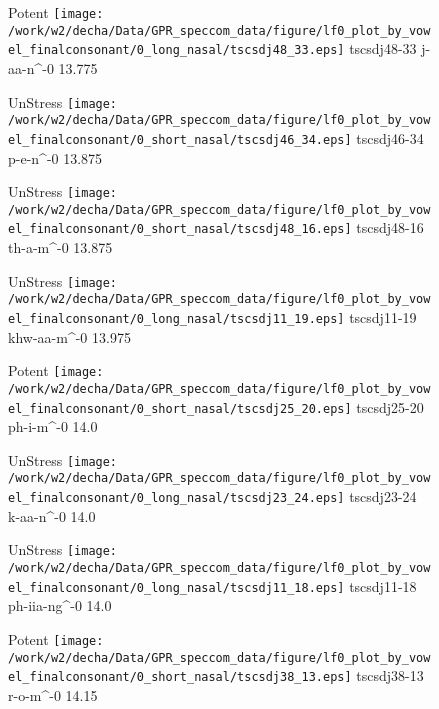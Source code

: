 \documentclass{article}
\begin{document}
\begin{figure}[t]
\begin{minipage}[b]{.24\textwidth}
\colorbox{Apricot}{Potent}
\centering
\texttt{[image: /work/w2/decha/Data/GPR\_speccom\_data/figure/lf0\_plot\_by\_vowel\_finalconsonant/0\_long\_nasal/tscsdj48\_33.eps]}
tscsdj48-33 j-aa-n\textasciicircum-0 13.775
\end{minipage}
\begin{minipage}[b]{.24\textwidth}
UnStress
\centering
\texttt{[image: /work/w2/decha/Data/GPR\_speccom\_data/figure/lf0\_plot\_by\_vowel\_finalconsonant/0\_short\_nasal/tscsdj46\_34.eps]}
tscsdj46-34 p-e-n\textasciicircum-0 13.875
\end{minipage}
\begin{minipage}[b]{.24\textwidth}
UnStress
\centering
\texttt{[image: /work/w2/decha/Data/GPR\_speccom\_data/figure/lf0\_plot\_by\_vowel\_finalconsonant/0\_short\_nasal/tscsdj48\_16.eps]}
tscsdj48-16 th-a-m\textasciicircum-0 13.875
\end{minipage}
\begin{minipage}[b]{.24\textwidth}
UnStress
\centering
\texttt{[image: /work/w2/decha/Data/GPR\_speccom\_data/figure/lf0\_plot\_by\_vowel\_finalconsonant/0\_long\_nasal/tscsdj11\_19.eps]}
tscsdj11-19 khw-aa-m\textasciicircum-0 13.975
\end{minipage}
\end{figure}
\clearpage
\begin{figure}[t]
\begin{minipage}[b]{.24\textwidth}
\colorbox{Apricot}{Potent}
\centering
\texttt{[image: /work/w2/decha/Data/GPR\_speccom\_data/figure/lf0\_plot\_by\_vowel\_finalconsonant/0\_short\_nasal/tscsdj25\_20.eps]}
tscsdj25-20 ph-i-m\textasciicircum-0 14.0
\end{minipage}
\begin{minipage}[b]{.24\textwidth}
UnStress
\centering
\texttt{[image: /work/w2/decha/Data/GPR\_speccom\_data/figure/lf0\_plot\_by\_vowel\_finalconsonant/0\_long\_nasal/tscsdj23\_24.eps]}
tscsdj23-24 k-aa-n\textasciicircum-0 14.0
\end{minipage}
\begin{minipage}[b]{.24\textwidth}
UnStress
\centering
\texttt{[image: /work/w2/decha/Data/GPR\_speccom\_data/figure/lf0\_plot\_by\_vowel\_finalconsonant/0\_long\_nasal/tscsdj11\_18.eps]}
tscsdj11-18 ph-iia-ng\textasciicircum-0 14.0
\end{minipage}
\begin{minipage}[b]{.24\textwidth}
\colorbox{Apricot}{Potent}
\centering
\texttt{[image: /work/w2/decha/Data/GPR\_speccom\_data/figure/lf0\_plot\_by\_vowel\_finalconsonant/0\_short\_nasal/tscsdj38\_13.eps]}
tscsdj38-13 r-o-m\textasciicircum-0 14.15
\end{minipage}
\end{figure}
\end{document}
